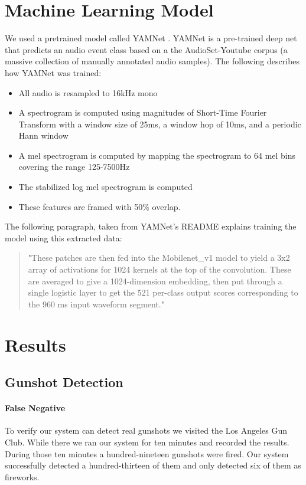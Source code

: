 \documentclass[conference]{IEEEtran}
\begin{document}
\section{Machine Learning Model}
We used a pretrained model called YAMNet  \cite{b6}. YAMNet is a pre-trained deep net that predicts an audio event class based on a the AudioSet-Youtube corpus (a massive collection of manually annotated audio samples). The following describes how YAMNet was trained: 
\begin{itemize}
    \item All audio is resampled to 16kHz mono
    \item A spectrogram is computed using magnitudes of Short-Time Fourier Transform with a window size of 25ms, a window hop of 10ms, and a periodic Hann window
    \item A mel spectrogram is computed by mapping the spectrogram to 64 mel bins covering the range 125-7500Hz
    \item The stabilized log mel spectrogram is computed 
  \item These features are framed with 50\% overlap. 
\end{itemize}
The following paragraph, taken from YAMNet’s README explains training the model using this extracted data:
\begin{quote}
"These patches are then fed into the Mobilenet\_v1 model to yield a 3x2 array of activations for 1024 kernels at the top of the convolution. These are averaged to give a 1024-dimension embedding, then put through a single logistic layer to get the 521 per-class output scores corresponding to the 960 ms input waveform segment."
\end{quote}


\section{Results}


\subsection{Gunshot Detection}



\paragraph{False Negative}To verify our system can detect real gunshots we visited the Los Angeles Gun Club. While there we ran our system for ten minutes and recorded the results. During those ten minutes a hundred-nineteen gunshots were fired. Our system successfully detected a hundred-thirteen of them and only detected six of them as fireworks.
\end{document}
